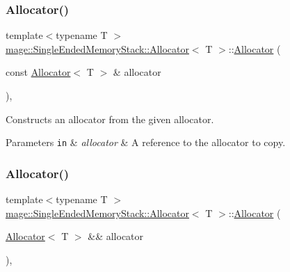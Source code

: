 \subsubsection{\texorpdfstring{Allocator()}{Allocator()}\hspace{0.1cm}{\footnotesize\ttfamily [1/4]}}
{\footnotesize\ttfamily template$<$typename T $>$ \\
\mbox{\hyperlink{classmage_1_1_single_ended_memory_stack_1_1_allocator}{mage\+::\+Single\+Ended\+Memory\+Stack\+::\+Allocator}}$<$ T $>$\+::\mbox{\hyperlink{classmage_1_1_single_ended_memory_stack_1_1_allocator}{Allocator}} (\begin{DoxyParamCaption}\item[{const \mbox{\hyperlink{classmage_1_1_single_ended_memory_stack_1_1_allocator}{Allocator}}$<$ T $>$ \&}]{allocator }\end{DoxyParamCaption})\hspace{0.3cm}{\ttfamily [default]}, {\ttfamily [noexcept]}}

Constructs an allocator from the given allocator.


\begin{DoxyParams}[1]{Parameters}
\mbox{\tt in}  & {\em allocator} & A reference to the allocator to copy. \\
\hline
\end{DoxyParams}
\mbox{\label{classmage_1_1_single_ended_memory_stack_1_1_allocator_a7d913b8b1a6b56a1f2dc06aba91e929c}} 
\subsubsection{\texorpdfstring{Allocator()}{Allocator()}\hspace{0.1cm}{\footnotesize\ttfamily [2/4]}}
{\footnotesize\ttfamily template$<$typename T $>$ \\
\mbox{\hyperlink{classmage_1_1_single_ended_memory_stack_1_1_allocator}{mage\+::\+Single\+Ended\+Memory\+Stack\+::\+Allocator}}$<$ T $>$\+::\mbox{\hyperlink{classmage_1_1_single_ended_memory_stack_1_1_allocator}{Allocator}} (\begin{DoxyParamCaption}\item[{\mbox{\hyperlink{classmage_1_1_single_ended_memory_stack_1_1_allocator}{Allocator}}$<$ T $>$ \&\&}]{allocator }\end{DoxyParamCaption})\hspace{0.3cm}{\ttfamily [default]}, {\ttfamily [noexcept]}}

